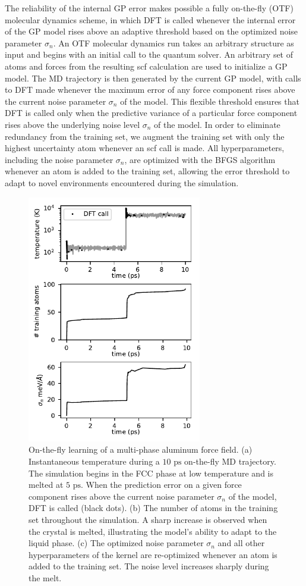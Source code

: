\documentclass[%
reprint,
superscriptaddress,
amsmath,amssymb,
aps,
prl,
]{revtex4-1}
\begin{document}
The reliability of the internal GP error makes possible a fully on-the-fly (OTF) molecular dynamics scheme, in which DFT is called whenever the internal error of the GP model rises above an adaptive threshold based on the optimized noise parameter $\sigma_n$. An OTF molecular dynamics run takes an arbitrary structure as input and begins with an initial call to the quantum solver. An arbitrary set of atoms and forces from the resulting scf calculation are used to initialize a GP model. The MD trajectory is then generated by the current GP model, with calls to DFT made whenever the maximum error of any force component rises above the current noise parameter $\sigma_n$ of the model. This flexible threshold ensures that DFT is called only when the predictive variance of a particular force component rises above the underlying noise level $\sigma_n$ of the model. In order to eliminate redundancy from the training set, we augment the training set with only the highest uncertainty atom whenever an scf call is made. All hyperparameters, including the noise parameter $\sigma_n$, are optimized with the BFGS algorithm whenever an atom is added to the training set, allowing the error threshold to adapt to novel environments encountered during the simulation.

\begin{figure}
	\centering
	\includegraphics[width=3in]{melt.pdf}
	\caption{On-the-fly learning of a multi-phase aluminum force field. (a) Instantaneous temperature during a $10 \text{ ps}$ on-the-fly MD trajectory. The simulation begins in the FCC phase at low temperature and is melted at $5 \text{ ps}$. When the prediction error on a given force component rises above the current noise parameter $\sigma_n$ of the model, DFT is called (black dots). (b) The number of atoms in the training set throughout the simulation. A sharp increase is observed when the crystal is melted, illustrating the model's ability to adapt to the liquid phase. (c) The optimized noise parameter $\sigma_n$ and all other hyperparameters of the kernel are re-optimized whenever an atom is added to the training set. The noise level increases sharply during the melt.}
\end{figure}
\end{document}
